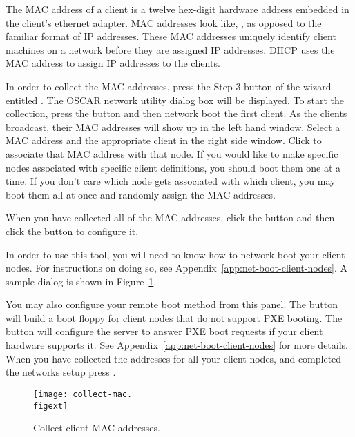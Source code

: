 The MAC address of a client
is a twelve hex-digit hardware address embedded in the client's
ethernet adapter. MAC addresses look like, , as
opposed to the familiar format of IP addresses. These MAC addresses
uniquely identify client machines on a network before they are
assigned IP addresses. DHCP uses the MAC address to assign IP 
addresses to the clients.

In order to collect the MAC addresses,  press the Step 3 button
  of the wizard entitled . The
  OSCAR network utility dialog box will be displayed.
  To start the collection, press the  button and then
  network boot the first client.  As the clients broadcast, their MAC addresses
  will show up in the left hand window. Select a MAC address and the appropriate
  client in the right side window. Click  to 
  associate that MAC address with that node. If you would like to make 
  specific nodes associated with specific client definitions, you should
  boot them one at a time. If you don't care which node gets associated
  with which client, you may boot them all at once and randomly assign
  the MAC addresses.

  When you have collected all of the MAC addresses, click the 
  button and then click the  button to configure it.

  In order to use this tool, you will need to know
  how to network boot your client nodes.  For instructions on doing
  so, see Appendix~\ref{app:net-boot-client-nodes}. A sample dialog
  is shown in Figure~\ref{fig:detailed-collect-mac}. 
 
  You may also configure your remote boot method from this panel. The
   button will build a boot floppy for
  client nodes that do not support PXE booting. The  button will configure the server to answer PXE boot requests if
  your client hardware supports it. See Appendix~\ref{app:net-boot-client-nodes}
  for more details.
  When you have collected the
  addresses for all your client nodes, and completed the networks setup
  press .

\begin{figure}[htbp]
  \begin{center}
    \texttt{[image: collect-mac.\\figext]}
    \caption{Collect client MAC addresses.}
    \label{fig:detailed-collect-mac}
  \end{center}
\end{figure}

